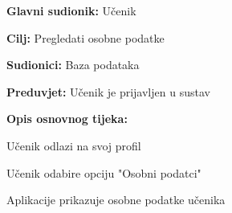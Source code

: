 					\noindent {}
					\begin{packed_item}
	
						\item \textbf{Glavni sudionik: }Učenik
						\item  \textbf{Cilj:} Pregledati osobne podatke
						\item  \textbf{Sudionici:} Baza podataka
						\item  \textbf{Preduvjet:} Učenik je prijavljen u sustav
						\item  \textbf{Opis osnovnog tijeka:}
						
						\item[] \begin{packed_enum}
	
							\item Učenik odlazi na svoj profil
							\item Učenik odabire opciju "Osobni podatci"
							\item Aplikacije prikazuje osobne podatke učenika
						\end{packed_enum}
						
					\end{packed_item}

